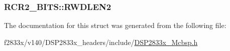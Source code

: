 \subsubsection[{R\+W\+D\+L\+E\+N2}]{ R\+C\+R2\+\_\+\+B\+I\+T\+S\+::\+R\+W\+D\+L\+E\+N2}\label{struct_r_c_r2___b_i_t_s_a34203dc15bd8448fdabe8a6e0a570249}


The documentation for this struct was generated from the following file\+:\begin{DoxyCompactItemize}
\item 
f2833x/v140/\+D\+S\+P2833x\+\_\+headers/include/\hyperlink{_d_s_p2833x___mcbsp_8h}{D\+S\+P2833x\+\_\+\+Mcbsp.\+h}\end{DoxyCompactItemize}

